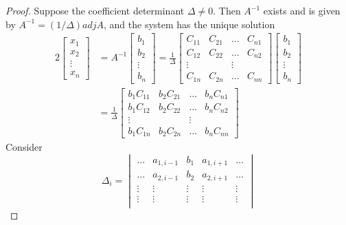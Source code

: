 \documentclass[../main.tex]{subfiles}
\begin{document}
\begin{proof}
  Suppose the coefficient determinant \(\Delta \neq 0\). Then \(A^{-1}\) exists and is given by \(A^{-1} = (1/\Delta)adjA\), and the system has the unique solution
  \begin{alignat}{2}
    \begin{bmatrix}
      x_1 \\ x_2 \\ \vdots \\ x_n
    \end{bmatrix}
    &=A^{-1}\begin{bmatrix}
      b_1 \\ b_2 \\ \vdots \\ b_n
    \end{bmatrix}
    =\frac{1}{\Delta}\begin{bmatrix}
      C_{11} & C_{21} & \ldots & C_{n1}\\
      C_{12} & C_{22} & \ldots & C_{n2}\\
      \vdots & & \vdots\\
      C_{1n} & C_{2n} & \ldots & C_{nn}
    \end{bmatrix}
    \begin{bmatrix}
      b_1 \\ b_2 \\ \vdots \\ b_n
    \end{bmatrix} \label{eq:4_3}\\ 
    &=
    \frac{1}{\Delta}\begin{bmatrix}
      b_1C_{11} & b_2C_{21} & \ldots & b_nC_{n1}\\
      b_1C_{12} & b_2C_{22} & \ldots & b_nC_{n2}\\
      \vdots & & \vdots\\
      b_1C_{1n} & b_2C_{2n} & \ldots & b_nC_{nn}
    \end{bmatrix} \label{eq:4_4}       
  \end{alignat}
  Consider
  \begin{equation} \label{eq:4_5}
    \Delta_i = \begin{vmatrix}
      \ldots & a_{1, i-1} & b_1 & a_{1,i+1} & \ldots\\
      \ldots & a_{2, i-1} & b_2 & a_{2,i+1} & \ldots\\
      \vdots & \vdots & \vdots & \vdots & \vdots\\
      \vdots & \vdots & \vdots & \vdots & \vdots\\

\end{vmatrix}
\end{equation}
\end{proof}
\end{document}
